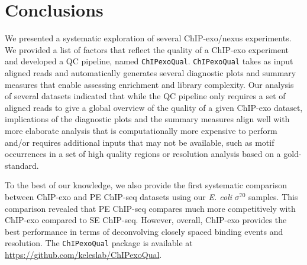 \documentclass{bmcart}
\newcommand{\pname}[1]{\texttt{ChIPexoQual}}
\newcommand{\sig}{\sigma^{70}}
\begin{document}
\section*{Conclusions}
\label{sec:conc}

We presented a systematic exploration of several ChIP-exo/nexus experiments. We
provided a list of factors that reflect the quality of a ChIP-exo
experiment and developed a QC pipeline, named \pname{}. \pname{} takes as input aligned reads and automatically generates several diagnostic plots and summary measures that enable assessing enrichment and library complexity.
Our analysis of several datasets indicated that
while the QC pipeline only requires a set of aligned reads
to give a global overview of the quality of a given ChIP-exo dataset, 
implications of the diagnostic plots and the summary measures align well
with more elaborate analysis that is computationally more
expensive to perform and/or requires additional inputs that may not be
available, such as motif occurrences in a set of high quality regions or
resolution analysis based on a gold-standard.


To the best of our knowledge, we also provide the first systematic
comparison between ChIP-exo and PE ChIP-seq datasets using our
\textit{E. coli} $\sig$ samples.  This comparison revealed that PE
ChIP-seq compares much more competitively with ChIP-exo compared to SE
ChIP-seq. However, overall, ChIP-exo provides the best performance in
terms of deconvolving closely spaced binding events and resolution.
The \pname{} package is available at
\url{https://github.com/keleslab/ChIPexoQual}.
\end{document}
